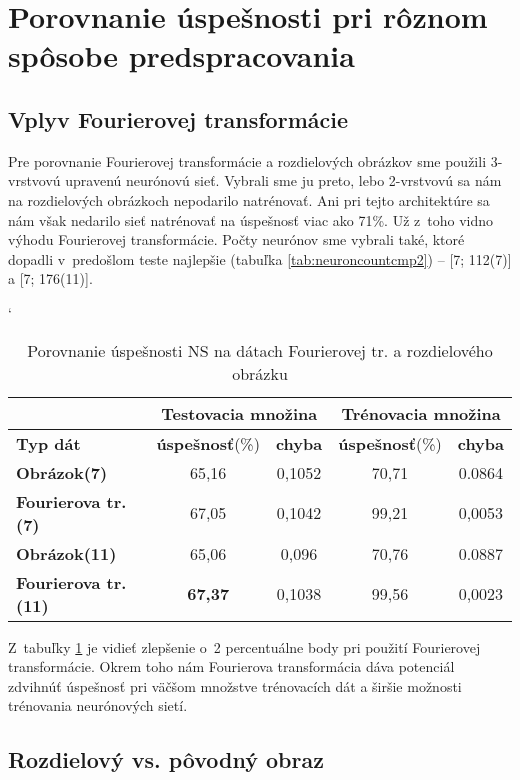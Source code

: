 \section{Porovnanie úspešnosti pri rôznom spôsobe predspracovania}

\subsection{Vplyv Fourierovej transformácie}

Pre porovnanie Fourierovej transformácie a rozdielových obrázkov sme použili 3-vrstvovú upravenú neurónovú sieť. Vybrali sme ju preto, lebo 2-vrstvovú sa nám na rozdielových obrázkoch nepodarilo natrénovať. Ani pri tejto architektúre sa nám však nedarilo sieť natrénovať na úspešnosť viac ako 71\%. Už z~toho vidno výhodu Fourierovej transformácie. Počty neurónov sme vybrali také, ktoré dopadli v~predošlom teste najlepšie (tabuľka \ref{tab:neuroncountcmp2}) -- [7; 112(7)] a [7; 176(11)].

\begin{table}[htp]
\catcode` %
\centering
\begin{tabular}{|l|c|c|c|c|}
\cline{2-5}
\multicolumn{1}{l}{} & \multicolumn{2}{|c|}{\textbf{Testovacia množina}} & \multicolumn{2}{c|}{\textbf{Trénovacia množina}}\\ 
\hline
\textbf{Typ dát} & \textbf{úspešnosť}(\%) & \textbf{chyba} & \textbf{úspešnosť}(\%) & \textbf{chyba}\\ \hline
\textbf{Obrázok(7)} & 65,16 & 0,1052 & 70,71 & 0.0864 \\ \hline
\textbf{Fourierova tr.(7)} & 67,05 & 0,1042 & 99,21 & 0,0053 \\ \hline 
\textbf{Obrázok(11)} & 65,06 & 0,096 & 70,76 & 0.0887 \\ \hline
\textbf{Fourierova tr.(11)} & \textbf{67,37} & 0,1038 & 99,56 & 0,0023 \\ \hline
\end{tabular}
\caption{Porovnanie úspešnosti NS na dátach Fourierovej tr. a rozdielového obrázku}
\label{tab:neuraldataftcmp}
\end{table}

Z~tabuľky \ref{tab:neuraldataftcmp} je vidieť zlepšenie o~2 percentuálne body pri použití Fourierovej transformácie. Okrem toho nám
Fourierova transformácia dáva potenciál zdvihnúť úspešnosť pri väčšom množstve trénovacích dát a širšie možnosti trénovania neurónových sietí. 

\subsection{Rozdielový vs. pôvodný obraz}

